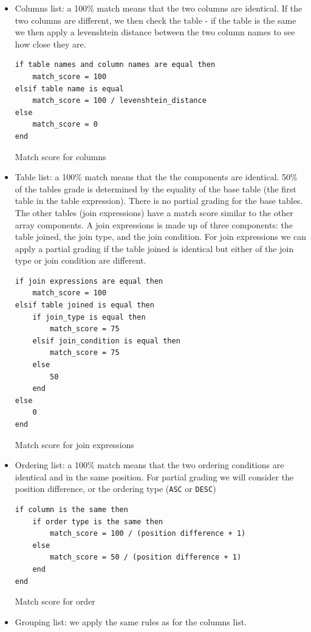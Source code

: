 \begin{itemize}
    \item Columns list: a 100\% match means that the two columns are identical. If the two columns are different, we then check the table - if the table is the same we then apply a levenshtein distance between the two column names to see how close they are.
    \begin{code}
    \begin{verbatim}
if table names and column names are equal then
    match_score = 100
elsif table name is equal
    match_score = 100 / levenshtein_distance
else
    match_score = 0
end
    \end{verbatim}
    \caption{Match score for columns}
    \end{code}
    \item Table list: a 100\% match means that the the components are identical. 50\% of the tables grade is determined by the equality of the base table  (the first table in the table expression). There is no partial grading for the base tables. The other tables (join expressions) have a match score similar to the other array components. A join expressions is made up of three components: the table joined, the join type, and the join condition. For join expressions we can apply a partial grading if the table joined is identical but either of the join type or join condition are different.
    \begin{code}
    \begin{verbatim}
if join expressions are equal then
    match_score = 100
elsif table joined is equal then
    if join_type is equal then
        match_score = 75
    elsif join_condition is equal then
        match_score = 75
    else
        50
    end
else
    0
end
    \end{verbatim}
    \caption{Match score for join expressions}
    \end{code}
    \item Ordering list: a 100\% match means that the two ordering conditions are identical and in the same position. For partial grading we will consider the position difference, or the ordering type (\texttt{ASC} or \texttt{DESC})
    \begin{code}
    
\begin{verbatim}
if column is the same then
    if order type is the same then
        match_score = 100 / (position difference + 1)
    else
        match_score = 50 / (position difference + 1)
    end
end
\end{verbatim}
\caption{Match score for order}
\end{code}
    \item Grouping list: we apply the same rules as for the columns list.
\end{itemize}


